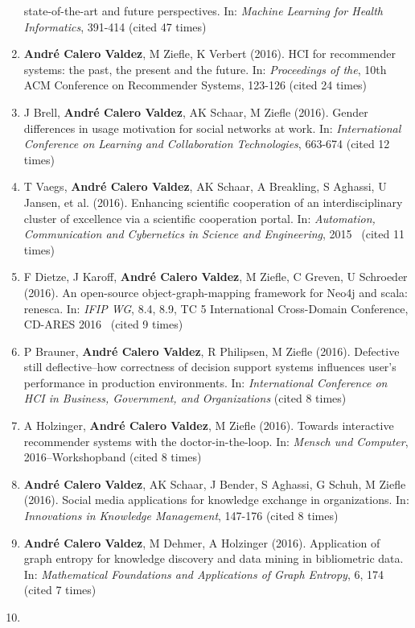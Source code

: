 \documentclass[11pt,a4paper,sans]{moderncv}
\begin{document}
\begin{enumerate}
  state-of-the-art and future perspectives. In: \emph{Machine Learning
  for Health Informatics}, 391-414 (cited 47 times)
\item
  \textbf{André Calero Valdez}, M Ziefle, K Verbert (2016). HCI for
  recommender systems: the past, the present and the future. In:
  \emph{Proceedings of the}, 10th ACM Conference on Recommender Systems,
  123-126 (cited 24 times)
\item
  J Brell, \textbf{André Calero Valdez}, AK Schaar, M Ziefle (2016).
  Gender differences in usage motivation for social networks at work.
  In: \emph{International Conference on Learning and Collaboration
  Technologies}, 663-674 (cited 12 times)
\item
  T Vaegs, \textbf{André Calero Valdez}, AK Schaar, A Breakling, S
  Aghassi, U Jansen, et al. (2016). Enhancing scientific cooperation of
  an interdisciplinary cluster of excellence via a scientific
  cooperation portal. In: \emph{Automation, Communication and
  Cybernetics in Science and Engineering}, 2015~ (cited 11 times)
\item
  F Dietze, J Karoff, \textbf{André Calero Valdez}, M Ziefle, C Greven,
  U Schroeder (2016). An open-source object-graph-mapping framework for
  Neo4j and scala: renesca. In: \emph{IFIP WG}, 8.4, 8.9, TC 5
  International Cross-Domain Conference, CD-ARES 2016~ (cited 9 times)
\item
  P Brauner, \textbf{André Calero Valdez}, R Philipsen, M Ziefle (2016).
  Defective still deflective--how correctness of decision support
  systems influences user's performance in production environments. In:
  \emph{International Conference on HCI in Business, Government, and
  Organizations} (cited 8 times)
\item
  A Holzinger, \textbf{André Calero Valdez}, M Ziefle (2016). Towards
  interactive recommender systems with the doctor-in-the-loop. In:
  \emph{Mensch und Computer}, 2016--Workshopband (cited 8 times)
\item
  \textbf{André Calero Valdez}, AK Schaar, J Bender, S Aghassi, G Schuh,
  M Ziefle (2016). Social media applications for knowledge exchange in
  organizations. In: \emph{Innovations in Knowledge Management}, 147-176
  (cited 8 times)
\item
  \textbf{André Calero Valdez}, M Dehmer, A Holzinger (2016).
  Application of graph entropy for knowledge discovery and data mining
  in bibliometric data. In: \emph{Mathematical Foundations and
  Applications of Graph Entropy}, 6, 174 (cited 7 times)
\item

\end{enumerate}
\end{document}
